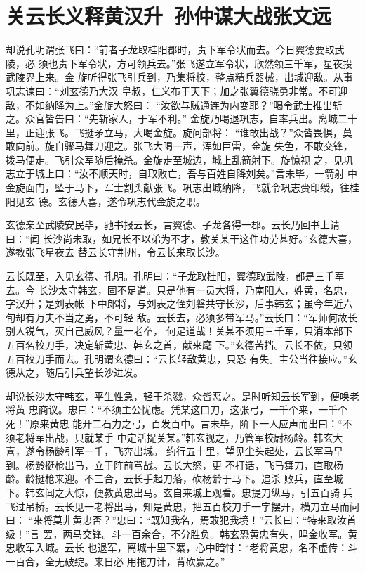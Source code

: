 \chapter{关云长义释黄汉升~孙仲谋大战张文远}

却说孔明谓张飞曰：“前者子龙取桂阳郡时，责下军令状而去。今日翼德要取武陵，必
须也责下军令状，方可领兵去。”张飞遂立军令状，欣然领三千军，星夜投武陵界上来。金
旋听得张飞引兵到，乃集将校，整点精兵器械，出城迎敌。从事巩志谏曰：“刘玄德乃大汉
皇叔，仁义布于天下；加之张翼德骁勇非常。不可迎敌，不如纳降为上。”金旋大怒曰：
“汝欲与贼通连为内变耶？”喝令武士推出斩之。众官皆告曰：“先斩家人，于军不利。”
金旋乃喝退巩志，自率兵出。离城二十里，正迎张飞。飞挺矛立马，大喝金旋。旋问部将：
“谁敢出战？”众皆畏惧，莫敢向前。旋自骤马舞刀迎之。张飞大喝一声，浑如巨雷，金旋
失色，不敢交锋，拨马便走。飞引众军随后掩杀。金旋走至城边，城上乱箭射下。旋惊视
之，见巩志立于城上曰：“汝不顺天时，自取败亡，吾与百姓自降刘矣。”言未毕，一箭射
中金旋面门，坠于马下，军士割头献张飞。巩志出城纳降，飞就令巩志赍印绶，往桂阳见玄
德。玄德大喜，遂令巩志代金旋之职。

玄德亲至武陵安民毕，驰书报云长，言翼德、子龙各得一郡。云长乃回书上请曰：“闻
长沙尚未取，如兄长不以弟为不才，教关某干这件功劳甚好。”玄德大喜，遂教张飞星夜去
替云长守荆州，令云长来取长沙。

云长既至，入见玄德、孔明。孔明曰：“子龙取桂阳，翼德取武陵，都是三千军去。今
长沙太守韩玄，固不足道。只是他有一员大将，乃南阳人，姓黄，名忠，字汉升；是刘表帐
下中郎将，与刘表之侄刘磐共守长沙，后事韩玄；虽今年近六旬却有万夫不当之勇，不可轻
敌。云长去，必须多带军马。”云长曰：“军师何故长别人锐气，灭自己威风？量一老卒，
何足道哉！关某不须用三千军，只消本部下五百名校刀手，决定斩黄忠、韩玄之首，献来麾
下。”玄德苦挡。云长不依，只领五百校刀手而去。孔明谓玄德曰：“云长轻敌黄忠，只恐
有失。主公当往接应。”玄德从之，随后引兵望长沙进发。

却说长沙太守韩玄，平生性急，轻于杀戮，众皆恶之。是时听知云长军到，便唤老将黄
忠商议。忠曰：“不须主公忧虑。凭某这口刀，这张弓，一千个来，一千个死！”原来黄忠
能开二石力之弓，百发百中。言未毕，阶下一人应声而出曰：“不须老将军出战，只就某手
中定活捉关某。”韩玄视之，乃管军校尉杨龄。韩玄大喜，遂令杨龄引军一千，飞奔出城。
约行五十里，望见尘头起处，云长军马早到。杨龄挺枪出马，立于阵前骂战。云长大怒，更
不打话，飞马舞刀，直取杨龄。龄挺枪来迎。不三合，云长手起刀落，砍杨龄于马下。追杀
败兵，直至城下。韩玄闻之大惊，便教黄忠出马。玄自来城上观看。忠提刀纵马，引五百骑
兵飞过吊桥。云长见一老将出马，知是黄忠，把五百校刀手一字摆开，横刀立马而问曰：
“来将莫非黄忠否？”忠曰：“既知我名，焉敢犯我境！”云长曰：“特来取汝首级！”言
罢，两马交锋。斗一百余合，不分胜负。韩玄恐黄忠有失，鸣金收军。黄忠收军入城。云长
也退军，离城十里下寨，心中暗忖：“老将黄忠，名不虚传：斗一百合，全无破绽。来日必
用拖刀计，背砍赢之。”

